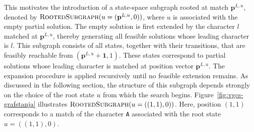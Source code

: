 \documentclass[runningheads]{llncs}
\begin{document}
	This motivates the introduction of a state-space subgraph rooted at match $\mathbf{p}^{L,u}$, denoted by $\textsc{RootedSubgraph}(u=(\mathbf{p}^{L,u},0))$, where $u$ is associated with the empty partial solution. The empty solution is first extended by the character $l$ matched at $\mathbf{p}^{L,u}$, thereby generating all feasible solutions whose leading character is $l$.  
	This subgraph consists of all states, together with their transitions, that are feasibly reachable from $(\mathbf{p}^{L,u}+\mathbf{1},1)$. These states correspond to partial solutions whose leading character is matched at position vector $\mathbf{p}^{L,u}$. The expansion procedure is applied recursively until no feasible extension remains.  As discussed in the following section, the structure of this subgraph depends strongly on the choice of the root state $u$ from which the search begins. Figure~\ref{fig:vgcs-grafstanja} illustrates $\textsc{RootedSubgraph}(u=((1,1),0))$. Here, position $(1,1)$ corresponds to a match of the character \texttt{A} associated with the root state $u=((1,1),0)$. 
	
\end{document}
